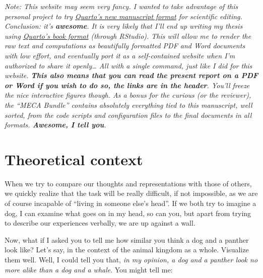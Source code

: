 \documentclass[
  authoryear]{elsarticle}
\begin{document}
\begin{tcolorbox}
\emph{Note: This website may seem very fancy. I wanted to take advantage
of this personal project to try
\href{https://quarto.org/docs/manuscripts/}{Quarto's new manuscript
format} for scientific editing. Conclusion: it's \textbf{awesome}. It is
very likely that I'll end up writing my thesis using
\href{https://quarto.org/docs/books/}{Quarto's book format} (through
RStudio). This will allow me to render the raw text and computations as
beautifully formatted PDF and Word documents with low effort, and
eventually port it as a self-contained website when I'm authorized to
share it openly\ldots{} All with a single command, just like I did for
this website. \textbf{This also means that you can read the present
report on a PDF or Word if you wish to do so, the links are in the
header}. You'll freeze the nice interactive figures though. As a bonus
for the curious (or the reviewer), the ``MECA Bundle'' contains
absolutely everything tied to this manuscript, well sorted, from the
code scripts and configuration files to the final documents in all
formats. \textbf{Awesome, I tell you}.}

\end{tcolorbox}

\newpage

\section{Theoretical context}\label{theoretical-context}

When we try to compare our thoughts and representations with those of
others, we quickly realize that the task will be really difficult, if
not impossible, as we are of course incapable of ``living in someone
else's head''. If we both try to imagine a dog, I can examine what goes
on in my head, so can you, but apart from trying to describe our
experiences verbally, we are up against a wall.

Now, what if I asked you to tell me how similar you think a dog and a
panther look like? Let's say, in the context of the animal kingdom as a
whole. Visualize them well. Well, I could tell you that, \emph{in my
opinion, a dog and a panther look no more alike than a dog and a whale}.
You might tell me: {}
\end{document}
